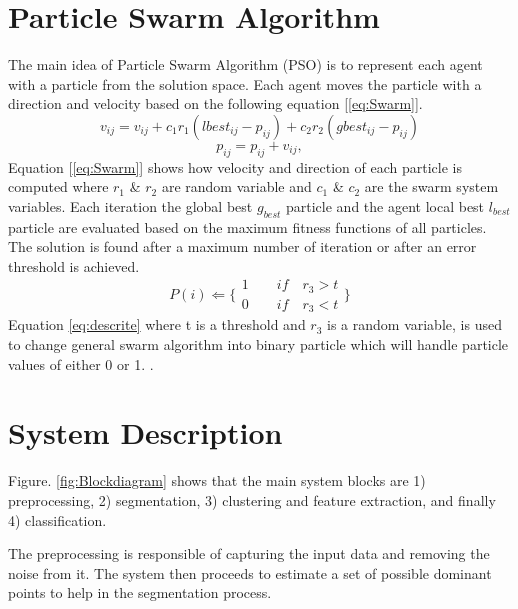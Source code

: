 \documentclass[a4paper,10pt]{IEEEconf}
\begin{document}
\section{Particle Swarm Algorithm}
\label{PSO}
The main idea of  Particle Swarm Algorithm (PSO) is to represent each agent with a particle from the solution space. Each agent moves the particle with a direction and velocity based on the following equation [\ref{eq:Swarm}].
\begin{equation}
v_{ij}  = v_{ij}  + c_1 r_1 (lbest_{ij}  - p_{ij} ) + c_2 r_2 (gbest_{ij}  - p_{ij} )
\label{eq:Swarm}
\end{equation}
\begin{equation}
p_{ij}=p_{ij}+v_{ij},
\end{equation}
 Equation [\ref{eq:Swarm}] shows how velocity and direction of each particle is computed where $r_1$ \& $r_2$ are random variable and $c_1$ \& $c_2$ are the swarm system variables. Each iteration the global best $g_{best}$ particle and  the agent local best $l_{best}$ particle are evaluated based on the maximum fitness functions of  all particles. The solution is found after a maximum number of iteration or after an error threshold is achieved.
 \begin{equation}
   P(i)\Leftarrow 
\{
\begin{array}{c} 
1 \quad \quad if\quad r_{3}>t  \\

0 \quad \quad if\quad r_{3}<t 
\label{eq:descrite}
\end{array}\}
\end{equation}
  Equation \ref{eq:descrite} where t is a threshold and $r_{3}$  is a random variable, is used to change general swarm algorithm into binary particle which will handle particle values of either 0 or 1. .  
\section{System Description}
\label{Sysdisc}
Figure. \ref{fig:Blockdiagram} shows that the main system blocks are 1) preprocessing, 2) segmentation, 3) clustering and feature extraction, and finally 4) classification. 

The preprocessing is responsible of capturing the input data and removing the noise from it. The system then proceeds to estimate a set of possible dominant points to help in the segmentation process. %
  
\end{document}
